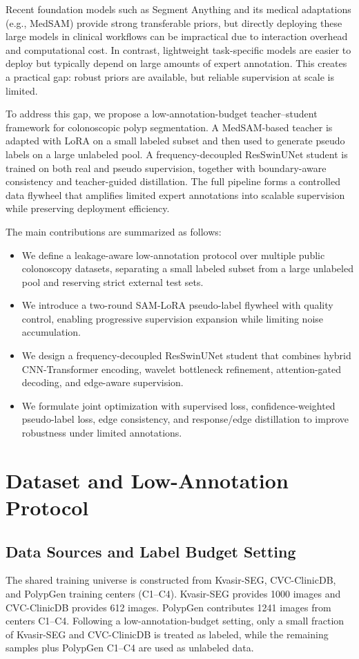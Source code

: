 ﻿\documentclass[11pt]{article}
\begin{document}
Recent foundation models such as Segment Anything and its medical adaptations (e.g., MedSAM) provide strong transferable priors, but directly deploying these large models in clinical workflows can be impractical due to interaction overhead and computational cost. In contrast, lightweight task-specific models are easier to deploy but typically depend on large amounts of expert annotation. This creates a practical gap: robust priors are available, but reliable supervision at scale is limited.

To address this gap, we propose a low-annotation-budget teacher--student framework for colonoscopic polyp segmentation. A MedSAM-based teacher is adapted with LoRA on a small labeled subset and then used to generate pseudo labels on a large unlabeled pool. A frequency-decoupled ResSwinUNet student is trained on both real and pseudo supervision, together with boundary-aware consistency and teacher-guided distillation. The full pipeline forms a controlled data flywheel that amplifies limited expert annotations into scalable supervision while preserving deployment efficiency.

The main contributions are summarized as follows:
\begin{itemize}[leftmargin=1.5em]
\item We define a leakage-aware low-annotation protocol over multiple public colonoscopy datasets, separating a small labeled subset from a large unlabeled pool and reserving strict external test sets.
\item We introduce a two-round SAM-LoRA pseudo-label flywheel with quality control, enabling progressive supervision expansion while limiting noise accumulation.
\item We design a frequency-decoupled ResSwinUNet student that combines hybrid CNN-Transformer encoding, wavelet bottleneck refinement, attention-gated decoding, and edge-aware supervision.
\item We formulate joint optimization with supervised loss, confidence-weighted pseudo-label loss, edge consistency, and response/edge distillation to improve robustness under limited annotations.
\end{itemize}

\section{Dataset and Low-Annotation Protocol}
\subsection{Data Sources and Label Budget Setting}
The shared training universe is constructed from Kvasir-SEG, CVC-ClinicDB, and PolypGen training centers (C1--C4). Kvasir-SEG provides 1000 images and CVC-ClinicDB provides 612 images. PolypGen contributes 1241 images from centers C1--C4. Following a low-annotation-budget setting, only a small fraction of Kvasir-SEG and CVC-ClinicDB is treated as labeled, while the remaining samples plus PolypGen C1--C4 are used as unlabeled data.
\end{document}

